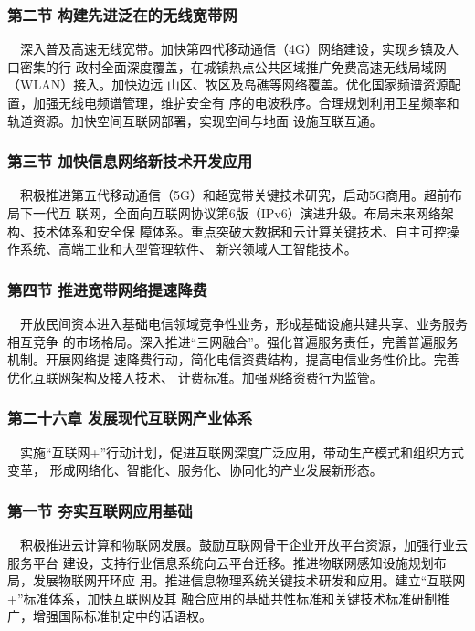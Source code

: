 \documentclass[11pt]{ctexart}
\begin{document}
{{{{\subsubsection{第二节 构建先进泛在的无线宽带网 }
\label{sec:org27dcca3}

  深入普及高速无线宽带。加快第四代移动通信（4G）网络建设，实现乡镇及人口密集的行
政村全面深度覆盖，在城镇热点公共区域推广免费高速无线局域网（WLAN）接入。加快边远
山区、牧区及岛礁等网络覆盖。优化国家频谱资源配置，加强无线电频谱管理，维护安全有
序的电波秩序。合理规划利用卫星频率和轨道资源。加快空间互联网部署，实现空间与地面
设施互联互通。

\subsubsection{第三节 加快信息网络新技术开发应用 }
\label{sec:org8614083}

  积极推进第五代移动通信（5G）和超宽带关键技术研究，启动5G商用。超前布局下一代互
联网，全面向互联网协议第6版（IPv6）演进升级。布局未来网络架构、技术体系和安全保
障体系。重点突破大数据和云计算关键技术、自主可控操作系统、高端工业和大型管理软件、
新兴领域人工智能技术。

\subsubsection{第四节 推进宽带网络提速降费 }
\label{sec:orgd0b55b9}

  开放民间资本进入基础电信领域竞争性业务，形成基础设施共建共享、业务服务相互竞争
的市场格局。深入推进“三网融合”。强化普遍服务责任，完善普遍服务机制。开展网络提
速降费行动，简化电信资费结构，提高电信业务性价比。完善优化互联网架构及接入技术、
计费标准。加强网络资费行为监管。

\subsubsection{第二十六章 发展现代互联网产业体系 }
\label{sec:orgb3426b0}

  实施“互联网+”行动计划，促进互联网深度广泛应用，带动生产模式和组织方式变革，
形成网络化、智能化、服务化、协同化的产业发展新形态。

\subsubsection{第一节 夯实互联网应用基础 }
\label{sec:org68a93aa}

  积极推进云计算和物联网发展。鼓励互联网骨干企业开放平台资源，加强行业云服务平台
建设，支持行业信息系统向云平台迁移。推进物联网感知设施规划布局，发展物联网开环应
用。推进信息物理系统关键技术研发和应用。建立“互联网+”标准体系，加快互联网及其
融合应用的基础共性标准和关键技术标准研制推广，增强国际标准制定中的话语权。

}}}}
\end{document}
